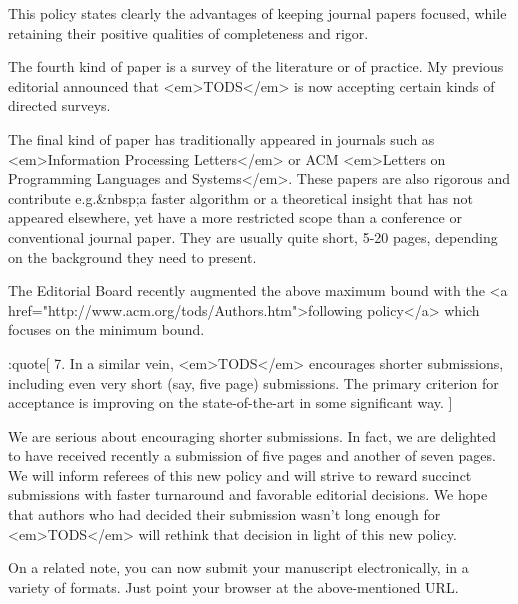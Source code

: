 This policy states clearly the advantages of keeping journal papers focused,
while retaining their positive qualities of completeness and rigor.

The fourth kind of paper is a survey of the literature or of practice. My
previous editorial announced that <em>TODS</em> is now accepting certain
kinds of directed surveys.

The final kind of paper has traditionally appeared in journals such as 
<em>Information Processing Letters</em> or 
ACM <em>Letters on Programming Languages and Systems</em>. 
These papers are also rigorous and contribute e.g.&nbsp;a
faster algorithm or a theoretical insight that has not appeared
elsewhere, yet have a more restricted scope than a conference or
conventional journal paper. They are usually quite short, 5-20 pages,
depending on the background they need to present.

The Editorial Board recently augmented the above maximum bound with the
<a href="http://www.acm.org/tods/Authors.htm">following policy</a> 
which focuses on the minimum bound.

:quote[
7. In a similar vein, <em>TODS</em> encourages shorter submissions, including
even very short (say, five page) submissions. The primary criterion for
acceptance is improving on the state-of-the-art in some significant way.
]

We are serious about encouraging shorter submissions. In fact, we are
delighted to have received recently a submission of five pages and another
of seven pages. We will inform referees of this new policy and will strive
to reward succinct submissions with faster turnaround and favorable editorial
decisions. We hope that authors who had decided their submission wasn't
long enough for <em>TODS</em> will rethink that decision in light of this new
policy.

On a related note, you can now submit your manuscript electronically, in
a variety of formats. Just point your browser at the above-mentioned URL.
